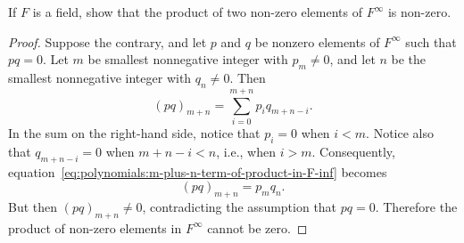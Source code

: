  If $F$ is a field, show that the product of two non-zero
elements of $F^\infty$ is non-zero.
\begin{proof}
  Suppose the contrary, and let $p$ and $q$ be nonzero elements of
  $F^\infty$ such that $pq = 0$. Let $m$ be smallest nonnegative
  integer with $p_m\neq0$, and let $n$ be the smallest nonnegative
  integer with $q_n\neq0$. Then
  \begin{equation}
    \label{eq:polynomials:m-plus-n-term-of-product-in-F-inf}
    (pq)_{m+n}
    = \sum_{i=0}^{m+n}p_iq_{m+n-i}.
  \end{equation}
  In the sum on the right-hand side, notice that $p_i = 0$ when
  $i < m$. Notice also that $q_{m+n-i} = 0$ when $m+n-i < n$, i.e.,
  when $i > m$. Consequently,
  equation~\eqref{eq:polynomials:m-plus-n-term-of-product-in-F-inf}
  becomes
  \begin{equation*}
    (pq)_{m+n} = p_mq_n.
  \end{equation*}
  But then $(pq)_{m+n}\neq0$, contradicting the assumption that
  $pq = 0$. Therefore the product of non-zero elements in $F^\infty$
  cannot be zero.
\end{proof}
